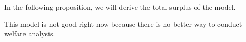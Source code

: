 In the following proposition, we will derive the total surplus of the model.

This model is not good right now because there is no better way to conduct welfare analysis.




\begin{proposition}

\end{proposition}










